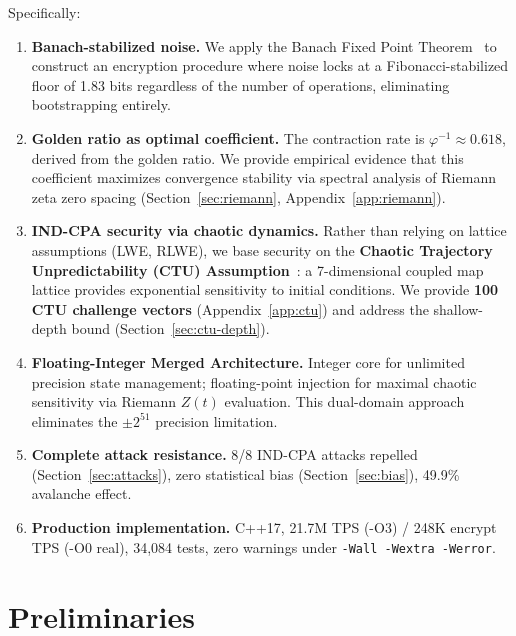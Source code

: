 \documentclass[11pt,a4paper]{article}
\begin{document}
Specifically:
\begin{enumerate}
\item \textbf{Banach-stabilized noise.} We apply the Banach Fixed Point Theorem~\cite{banach22} to construct an encryption procedure where noise locks at a Fibonacci-stabilized floor of 1.83 bits regardless of the number of operations, eliminating bootstrapping entirely.

\item \textbf{Golden ratio as optimal coefficient.} The contraction rate is $\varphi^{-1} \approx 0.618$, derived from the golden ratio. We provide empirical evidence that this coefficient maximizes convergence stability via spectral analysis of Riemann zeta zero spacing (Section~\ref{sec:riemann}, Appendix~\ref{app:riemann}).

\item \textbf{IND-CPA security via chaotic dynamics.} Rather than relying on lattice assumptions (LWE, RLWE), we base security on the \textbf{Chaotic Trajectory Unpredictability (CTU) Assumption}~\cite{strogatz2018}: a 7-dimensional coupled map lattice provides exponential sensitivity to initial conditions. We provide \textbf{100 CTU challenge vectors} (Appendix~\ref{app:ctu}) and address the shallow-depth bound (Section~\ref{sec:ctu-depth}).

\item \textbf{Floating-Integer Merged Architecture.} Integer core for unlimited precision state management; floating-point injection for maximal chaotic sensitivity via Riemann $Z(t)$ evaluation. This dual-domain approach eliminates the $\pm 2^{51}$ precision limitation.

\item \textbf{Complete attack resistance.} 8/8 IND-CPA attacks repelled (Section~\ref{sec:attacks}), zero statistical bias (Section~\ref{sec:bias}), 49.9\% avalanche effect.

\item \textbf{Production implementation.} C++17, 21.7M TPS (-O3) / 248K encrypt TPS (-O0 real), 34,084 tests, zero warnings under \texttt{-Wall -Wextra -Werror}.
\end{enumerate}

\section{Preliminaries}
\end{document}
